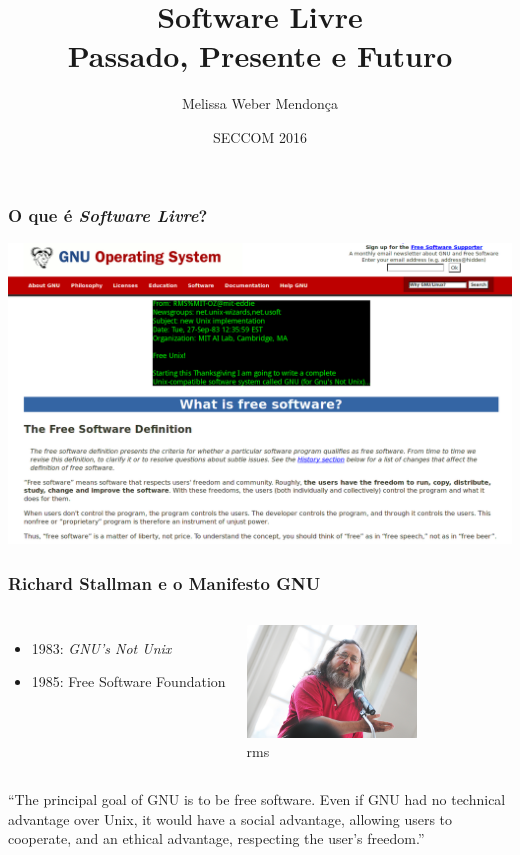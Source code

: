 \documentclass{beamer}
\title{Software Livre\\Passado, Presente e Futuro}
\author{Melissa Weber Mendonça}
\date{SECCOM 2016}
\begin{document}
{%
\begin{frame}%
   \titlepage
\end{frame}%
}

\begin{frame}
   \frametitle{O que é \emph{Software Livre}?}
   \begin{center}
     \includegraphics[width=\textwidth]{images/gnu_free.png}
   \end{center}
\end{frame}

\begin{frame}
   \frametitle{Richard Stallman e o Manifesto GNU}
   \begin{columns}
     \column{6cm}
     \begin{itemize}
       \item 1983: \emph{GNU's Not Unix}
       \item 1985: Free Software Foundation
     \end{itemize}
     \column{4.5cm}
     \begin{center}
       \includegraphics[width=4.5cm,trim=40mm 0mm 40mm 0mm,clip]{images/stallman.jpg}\\
       rms
     \end{center}
   \end{columns}
   \begin{center}
     ``The principal goal of GNU is to be free software. Even if GNU had no technical advantage over Unix, it would have a social advantage, allowing users to cooperate, and an ethical advantage, respecting the user's freedom.''
   \end{center}
\end{frame}
\end{document}
